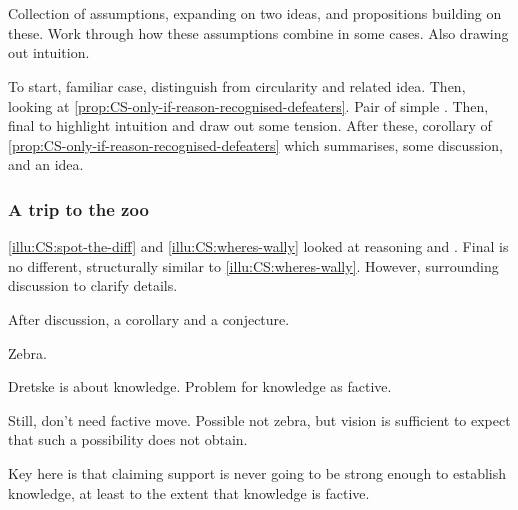 \section{}
\label{sec:CS:illustrations}

\begin{note}
  Collection of assumptions, expanding on two ideas, and propositions building on these.
  Work through how these assumptions combine in some cases.
  Also drawing out intuition.

  To start, familiar case, distinguish from circularity and related idea.
  Then, looking at \autoref{prop:CS-only-if-reason-recognised-defeaters}.
  Pair of simple .
  Then, final  to highlight intuition and draw out some tension.
  After these, corollary of \autoref{prop:CS-only-if-reason-recognised-defeaters} which summarises, some discussion, and an idea.
\end{note}

\subsubsection{A trip to the zoo}

\begin{note}
   \ref{illu:CS:spot-the-diff} and \ref{illu:CS:wheres-wally} looked at reasoning and .
  Final  is no different, structurally similar to \autoref{illu:CS:wheres-wally}.
  However, surrounding discussion to clarify details.

  After discussion, a corollary and a conjecture.
\end{note}

\begin{note}
  Zebra.

  Dretske is about knowledge.
  Problem for knowledge as factive.

  Still, don't need factive move.
  Possible not zebra, but vision is sufficient to expect that such a possibility does not obtain.

  Key here is that claiming support is never going to be strong enough to establish knowledge, at least to the extent that knowledge is factive.
\end{note}

